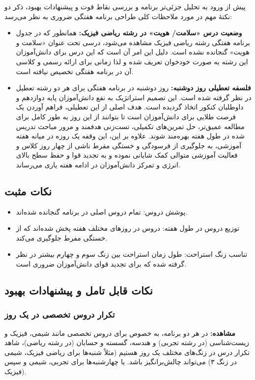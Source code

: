 \documentclass[a4paper]{article}
\begin{document}
\noindent پیش از ورود به تحلیل جزئی‌تر برنامه و بررسی نقاط قوت و پیشنهادات بهبود، ذکر دو نکتهٔ مهم در مورد ملاحظات کلی طراحی برنامه هفتگی ضروری به نظر می‌رسد:

\begin{itemize}
    \item \textbf{وضعیت درس «سلامت/ هویت» در رشته ریاضی فیزیک:} همانطور که در جدول برنامه هفتگی رشته ریاضی فیزیک مشاهده می‌شود، درسی تحت عنوان «سلامت و هویت» گنجانده نشده است. دلیل این امر آن است که این درس برای دانش‌آموزان این رشته به صورت خودخوان تعریف شده و لذا زمانی برای ارائه رسمی و کلاسی آن در برنامه هفتگی تخصیص نیافته است.
    \item \textbf{فلسفه تعطیلی روز دوشنبه:} روز دوشنبه در برنامه هفتگی برای هر دو رشته تعطیل در نظر گرفته شده است. این تصمیم استراتژیک به نفع دانش‌آموزان پایه دوازدهم و داوطلبان کنکور اتخاذ گردیده است. هدف اصلی از این تعطیلی، فراهم آوردن یک فرصت طلایی برای دانش‌آموزان است تا بتوانند از این روز به طور کامل برای مطالعه عمیق‌تر، حل تمرین‌های تکمیلی، تست‌زنی هدفمند و مرور مباحث تدریس شده در طول هفته بهره‌مند شوند. علاوه بر این، این وقفه یک روزه در میانه هفته آموزشی، به جلوگیری از فرسودگی و خستگی مفرط ناشی از چهار روز کلاس و فعالیت آموزشی متوالی کمک شایانی نموده و به تجدید قوا و حفظ سطح بالای انرژی و تمرکز دانش‌آموزان در ادامه هفته یاری می‌رساند.
\end{itemize}
\medskip

\subsection*{نکات مثبت}
\begin{itemize}
    \item پوشش دروس: تمام دروس اصلی در برنامه گنجانده شده‌اند.
    \item توزیع دروس در طول هفته: دروس در روزهای مختلف هفته پخش شده‌اند که از خستگی مفرط جلوگیری می‌کند.
    \item تناسب زنگ استراحت: طول زمان استراحت بین زنگ سوم و چهارم بیشتر در نظر گرفته شده که برای تجدید قوای دانش‌آموزان ضروری است.
\end{itemize}
\bigskip

\subsection*{نکات قابل تامل و پیشنهادات بهبود}
\medskip

\subsubsection*{تکرار دروس تخصصی در یک روز}
\textbf{مشاهده:} در هر دو برنامه، به خصوص برای دروس تخصصی مانند شیمی، فیزیک و زیست‌شناسی (در رشته تجربی) و هندسه، گسسته و حسابان (در رشته ریاضی)، شاهد تکرار درس در زنگ‌های مختلف یک روز هستیم (مثلاً شنبه‌ها برای ریاضی فیزیک، شیمی در زنگ ۳) می‌تواند چالش‌برانگیز باشد. یا چهارشنبه‌ها برای تجربی، شیمی و سپس فیزیک).
\end{document}
